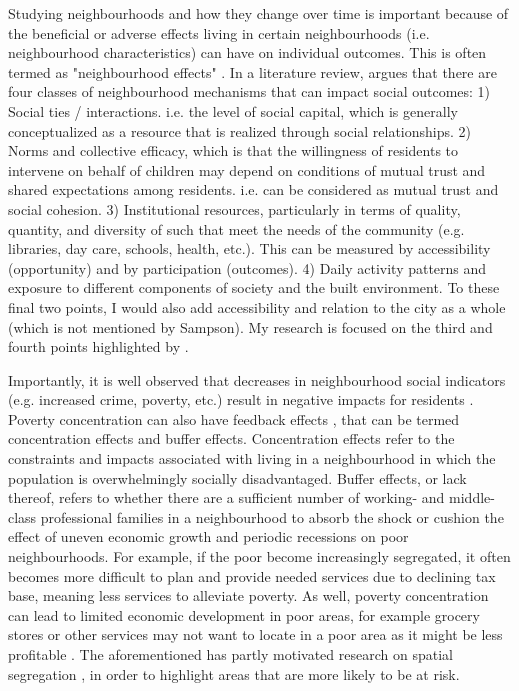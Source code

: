 Studying neighbourhoods and how they change over time is important because of the beneficial or adverse effects living in certain neighbourhoods (i.e. neighbourhood characteristics) can have on individual outcomes. This is often termed as "neighbourhood effects" \cite{sampson_assessing_2002}. In a literature review,  argues that there are four classes of neighbourhood mechanisms that can impact social outcomes:
1) Social ties / interactions. i.e. the level of social capital, which is generally conceptualized as a resource that is realized through social relationships.
2) Norms and collective efficacy, which is that the willingness of residents to intervene on behalf of children may depend on conditions of mutual trust and shared expectations among residents. i.e. can be considered as mutual trust and social cohesion.
3) Institutional resources, particularly in terms of quality, quantity, and diversity of such that meet the needs of the community (e.g. libraries, day care, schools, health, etc.). This can be measured by accessibility (opportunity) and by participation (outcomes).
4) Daily activity patterns and exposure to different components of society and the built environment. To these final two points, I would also add accessibility and relation to the city as a whole (which is not mentioned by Sampson). My research is focused on the third and fourth points highlighted by .


Importantly, it is well observed that decreases in neighbourhood social indicators (e.g. increased crime, poverty, etc.) result in negative impacts for  residents  \cite{sampson_assessing_2002}. Poverty concentration can also have feedback effects \cite{wilson_truly_2012}, that can be termed concentration effects and buffer effects. Concentration effects refer to the constraints and impacts associated with living in a neighbourhood in which the population is overwhelmingly socially disadvantaged. Buffer effects, or lack thereof, refers to whether there are a sufficient number of working- and middle-class professional families in a neighbourhood to absorb the shock or cushion the effect of uneven economic growth and periodic recessions on poor neighbourhoods. For example, if the poor become increasingly segregated, it often becomes more difficult to plan and provide needed services due to declining tax base, meaning less services to alleviate poverty. As well, poverty concentration can lead to limited economic development in poor areas, for example grocery stores or other services may not want to locate in a poor area as it might be less profitable \cite{ades_are_2012}. The aforementioned has partly motivated research on spatial segregation \cite{massey_dimensions_1988}, in order to highlight areas that are more likely to be at risk.

